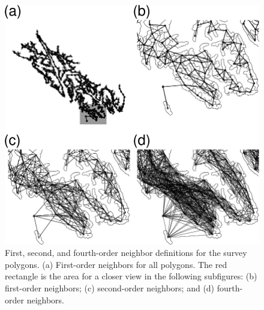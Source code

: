 \documentclass[11pt, titlepage]{article}\usepackage[]{graphicx}\usepackage[]{color}
\begin{document}
\begin{figure}[H]
  \begin{center}
  \includegraphics[width=\linewidth]{figure/Fig-Neighbors.png}
  \end{center}
  \caption{First, second, and fourth-order neighbor definitions for the survey polygons. (a) First-order neighbors for all polygons.  The red rectangle is the area for a closer view in the following subfigures: (b) first-order neighbors; (c) second-order neighbors; and (d) fourth-order neighbors. \label{Fig-Neighbors}}     
\end{figure}


\end{document}
